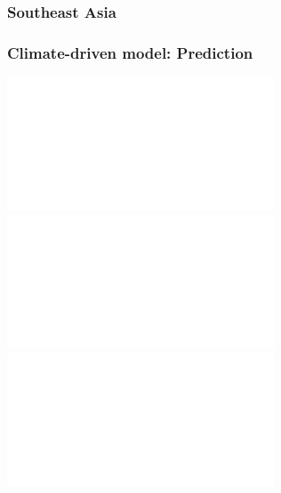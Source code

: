 {
\begin{frame}
    \frametitle{Southeast Asia}    
\end{frame}
}

\begin{frame}
    \frametitle{Climate-driven model: Prediction}
    \centerline{
    \includegraphics<1>[width=\textwidth]{../images/sea-level-prediction-bare.pdf}
    \includegraphics<2>[width=\textwidth]{../images/sea-level-prediction-trees.pdf}
    \includegraphics<3>[width=\textwidth]{../images/sea-level-prediction-trees-labels.pdf}
    }
\end{frame}

